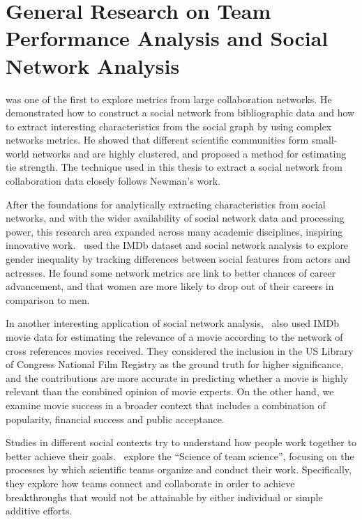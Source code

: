 \section{General Research on Team Performance Analysis and Social Network
Analysis}
\label{sec:loosely}
\cite{newman2001structure} was one of the first to explore metrics from large
collaboration networks. He demonstrated how to construct a social network from
bibliographic data and how to extract interesting characteristics from the
social graph by using complex networks metrics. He showed that different
scientific communities form small-world networks and are highly clustered, and
proposed a method for estimating tie strength. The technique used in this
thesis to extract a social network from collaboration data closely follows
Newman's work.

After the foundations for analytically extracting characteristics from social
networks, and with the wider availability of social network data and processing
power, this research area expanded across many academic disciplines, inspiring
innovative work.~\cite{lutter2013there} used the IMDb dataset and social
network analysis to explore gender inequality by tracking differences between
social features from actors and actresses. He found some network metrics are
link to better chances of career advancement, and that women are more likely to
drop out of their careers in comparison to men.

In another interesting application of social network
analysis,~\cite{wasserman2015cross} also used IMDb movie data for estimating
the relevance of a movie according to the network of cross references movies
received. They considered the inclusion in the US Library of Congress National
Film Registry as the ground truth for higher significance, and the
contributions are more accurate in predicting whether a movie is highly
relevant than the combined opinion of movie experts. On the other hand, we
examine movie success in a broader context that includes a combination of
popularity, financial success and public acceptance.

Studies in different social contexts try to understand how people work together
to better achieve their goals.~\cite{stokols2008} explore the ``Science of team
science'', focusing on the processes by which scientific teams organize and
conduct their work. Specifically, they explore how teams connect and
collaborate in order to achieve breakthroughs that would not be attainable by
either individual or simple additive efforts.


